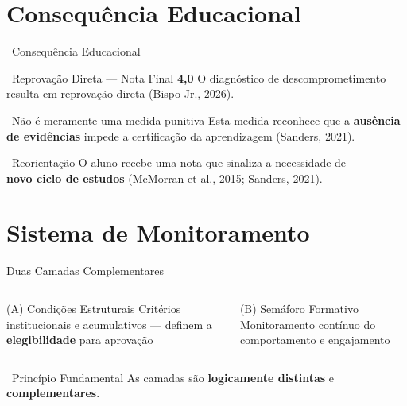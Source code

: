 \documentclass[xcolor=dvipsnames,table]{beamer}
\begin{document}
  \section{Consequência Educacional}

  \begin{frame}{\faExclamationTriangle\ Consequência Educacional}
    \begin{alertblock}{\centering \faBan\ Reprovação Direta --- Nota Final \textbf{4,0}}
      \centering O diagnóstico de descomprometimento\\ resulta em reprovação direta (Bispo Jr., 2026).
    \end{alertblock}
    \pause
    \begin{block}{\faInfoCircle\ Não é meramente uma medida punitiva}
      Esta medida reconhece que a \textbf{ausência de evidências} impede a certificação da
      aprendizagem (Sanders, 2021).
    \end{block}
    \pause
    \begin{exampleblock}{\faRedoAlt\ Reorientação}
      O aluno recebe uma nota que sinaliza a necessidade de \\\textbf{novo ciclo de estudos}
      (McMorran et al., 2015; Sanders, 2021).
    \end{exampleblock}
  \end{frame}

  \section{Sistema de Monitoramento}

  \begin{frame}{Duas Camadas Complementares}
    \begin{columns}
      \begin{block}{\centering (A) Condições Estruturais}
        \centering \small Critérios institucionais e acumulativos — definem a \textbf{elegibilidade}
        para aprovação
      \end{block}
      \begin{alertblock}{\centering (B) Semáforo Formativo}
        \centering \small Monitoramento contínuo do comportamento e engajamento
      \end{alertblock}
    \end{columns}
    \vspace{1em}
    \pause
    \begin{exampleblock}{\centering \faInfoCircle\ Princípio Fundamental}
      \centering As camadas são \textbf{logicamente distintas} e \textbf{complementares}.
    \end{exampleblock}
  \end{frame}
\end{document}
